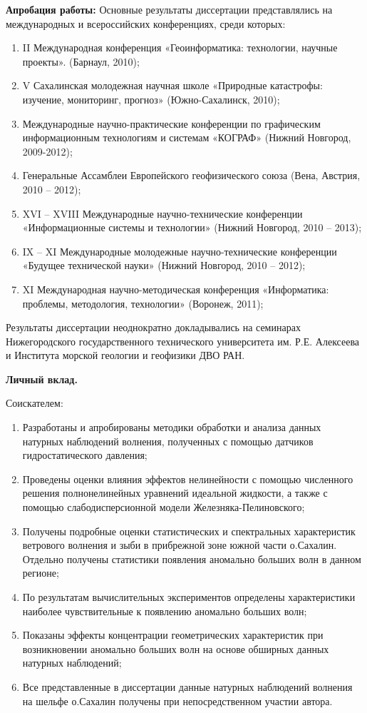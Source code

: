 \textbf{Апробация работы:}
Основные результаты диссертации представлялись на международных и всероссийских конференциях, среди которых:
\begin{enumerate}
  \item II Международная конференция «Геоинформатика: технологии, научные проекты». (Барнаул, 2010);
  \item V Сахалинская молодежная научная школе «Природные катастрофы: изучение, мониторинг, прогноз» (Южно-Сахалинск, 2010);
  \item Международные научно-практические конференции по графическим информационным технологиям и системам «КОГРАФ» (Нижний Новгород, 2009-2012);
  \item Генеральные Ассамблеи Европейского геофизического союза (Вена, Австрия, 2010 – 2012);
  \item XVI – XVIII Международные научно-технические конференции «Информационные системы и технологии» (Нижний Новгород, 2010 – 2013);
  \item IX – XI Международные молодежные научно-технические конференции «Будущее технической науки» (Нижний Новгород, 2010 – 2012);
  \item XI Международная научно-методическая конференция «Информатика: проблемы, методология, технологии» (Воронеж, 2011);
  
\end{enumerate}
	
Результаты диссертации неоднократно докладывались на семинарах Нижегородского государственного технического университета им. Р.Е. Алексеева и Института морской геологии и геофизики ДВО РАН.


\textbf{Личный вклад.}

Соискателем:
\begin{enumerate}
  \item Разработаны и апробированы методики обработки и анализа данных натурных наблюдений волнения, полученных с помощью датчиков гидростатического давления;
  \item Проведены оценки влияния эффектов нелинейности с помощью численного решения полнонелинейных уравнений идеальной жидкости, а также с помощью слабодисперсионной модели Железняка-Пелиновского;
  \item Получены подробные оценки статистических и спектральных характеристик ветрового волнения и зыби в прибрежной зоне южной части о.Сахалин. Отдельно получены статистики появления аномально больших волн в данном регионе;
  \item По результатам вычислительных экспериментов определены характеристики наиболее чувствительные к появлению аномально больших волн;
  \item Показаны эффекты концентрации геометрических характеристик при возникновении аномально больших волн на основе обширных данных натурных наблюдений;
  \item Все представленные в диссертации данные натурных наблюдений волнения на шельфе о.Сахалин получены при непосредственном участии автора.
\end{enumerate}

